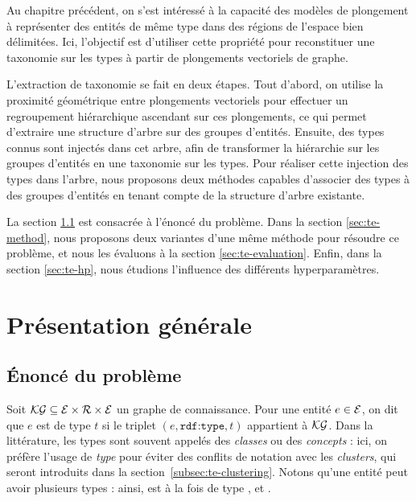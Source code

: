 \label{chap:te}


Au chapitre précédent, on s'est intéressé à la capacité des modèles de plongement à représenter des entités de même type dans des régions de l'espace bien délimitées. Ici, l'objectif est d'utiliser cette propriété pour reconstituer une taxonomie sur les types à partir de plongements vectoriels de graphe. 

L'extraction de taxonomie se fait en deux étapes.
Tout d'abord, on utilise la proximité géométrique entre plongements vectoriels pour effectuer un regroupement hiérarchique ascendant sur ces plongements,
ce qui permet d'extraire une structure d'arbre sur des groupes d'entités. Ensuite, des types connus sont injectés dans cet arbre, afin de transformer la hiérarchie sur les groupes d'entités en une taxonomie sur les types. Pour réaliser cette injection des types dans l'arbre, nous proposons deux méthodes capables d'associer des types à des groupes d'entités en tenant compte de la structure d'arbre existante.



La section \ref{sec:te-problem} est consacrée à l'énoncé du problème. Dans la section \ref{sec:te-method}, nous proposons deux variantes d'une même méthode pour résoudre ce problème, et nous les évaluons à la section \ref{sec:te-evaluation}. Enfin, dans la section \ref{sec:te-hp}, nous étudions l'influence des différents hyperparamètres.



\section{Présentation générale}
\subsection{Énoncé du problème}
\label{sec:te-problem}
Soit $\mathcal{KG} \subseteq \mathcal{E} \times \mathcal{R} \times \mathcal{E}$ un graphe de connaissance. Pour une entité $e \in \mathcal{E}$, on dit que $e$ est de type $t$ si le triplet $(e, \texttt{rdf:type}, t)$ appartient à $\mathcal{KG}$. Dans la littérature, les types sont souvent appelés des \textit{classes} ou des \textit{concepts} : ici, on préfère l'usage de \textit{type} pour éviter des conflits de notation avec les \textit{clusters}, qui seront introduits dans la section~\ref{subsec:te-clustering}. Notons qu'une entité peut avoir plusieurs types : ainsi,  est à la fois de type ,  et .

